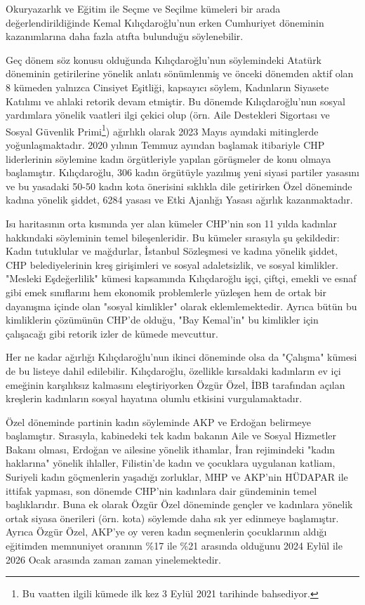 Okuryazarlık ve Eğitim ile Seçme
ve Seçilme kümeleri bir arada değerlendirildiğinde Kemal Kılıçdaroğlu'nun erken Cumhuriyet döneminin 
kazanımlarına daha fazla atıfta bulunduğu söylenebilir. 

Geç dönem söz konusu olduğunda Kılıçdaroğlu'nun söylemindeki Atatürk döneminin getirilerine yönelik anlatı
sönümlenmiş ve önceki dönemden aktif olan 8 kümeden yalnızca Cinsiyet Eşitliği, kapsayıcı söylem, Kadınların Siyasete Katılımı ve ahlaki 
retorik devam etmiştir. Bu dönemde Kılıçdaroğlu'nun sosyal yardımlara yönelik vaatleri ilgi çekici olup (örn. Aile Destekleri Sigortası ve Sosyal Güvenlik Primi\footnote{Bu vaatten ilgili kümede ilk kez 3 Eylül 2021 tarihinde bahsediyor.}) ağırlıklı olarak 2023 Mayıs ayındaki mitinglerde yoğunlaşmaktadır.
2020 yılının Temmuz ayından başlamak itibariyle CHP liderlerinin söylemine kadın örgütleriyle yapılan
görüşmeler de konu olmaya başlamıştır. Kılıçdaroğlu, 306 kadın örgütüyle yazılmış yeni siyasi partiler yasasını ve bu yasadaki
50-50 kadın kota önerisini sıklıkla dile getirirken Özel döneminde kadına yönelik şiddet, 6284 yasası ve Etki Ajanlığı Yasası 
ağırlık kazanmaktadır. 

Isı haritasının orta kısmında yer alan kümeler CHP'nin son 11 yılda kadınlar hakkındaki
söyleminin temel bileşenleridir. Bu kümeler sırasıyla şu şekildedir: Kadın tutuklular ve mağdurlar, İstanbul Sözleşmesi ve kadına yönelik şiddet,
CHP belediyelerinin kreş girişimleri ve sosyal adaletsizlik, ve sosyal kimlikler. "Mesleki Eşdeğerlilik" kümesi kapsamında Kılıçdaroğlu işçi, çiftçi, emekli ve esnaf gibi 
emek sınıflarını hem ekonomik problemlerle yüzleşen hem de ortak bir dayanışma içinde olan "sosyal kimlikler" olarak eklemlemektedir.
Ayrıca bütün bu kimliklerin çözümünün CHP'de olduğu, "Bay Kemal'in" bu kimlikler için çalışacağı gibi retorik izler de kümede mevcuttur.

Her ne kadar ağırlığı Kılıçdaroğlu'nun ikinci döneminde olsa da 
"Çalışma" kümesi de bu listeye dahil edilebilir. Kılıçdaroğlu, özellikle kırsaldaki kadınların ev içi emeğinin karşılıksız kalmasını eleştiriyorken
Özgür Özel, İBB tarafından açılan kreşlerin kadınların sosyal hayatına olumlu etkisini vurgulamaktadır.

Özel döneminde partinin kadın söyleminde AKP ve Erdoğan belirmeye başlamıştır.
Sırasıyla, kabinedeki tek kadın bakanın Aile ve Sosyal Hizmetler
Bakanı olması, Erdoğan ve ailesine yönelik ithamlar, İran rejimindeki "kadın haklarına" yönelik ihlaller, Filistin'de kadın ve çocuklara uygulanan katliam,
Suriyeli kadın göçmenlerin yaşadığı zorluklar, MHP ve AKP'nin HÜDAPAR ile ittifak yapması, son dönemde CHP'nin kadınlara dair gündeminin temel başlıklarıdır. Buna ek olarak Özgür Özel döneminde gençler ve kadınlara yönelik ortak siyasa önerileri (örn. kota) 
söylemde daha sık yer edinmeye başlamıştır. Ayrıca Özgür Özel, AKP'ye oy veren kadın seçmenlerin çocuklarının aldığı eğitimden memnuniyet oranının \%17 ile \%21 arasında olduğunu 2024 Eylül ile 2026 Ocak arasında zaman zaman yinelemektedir.

